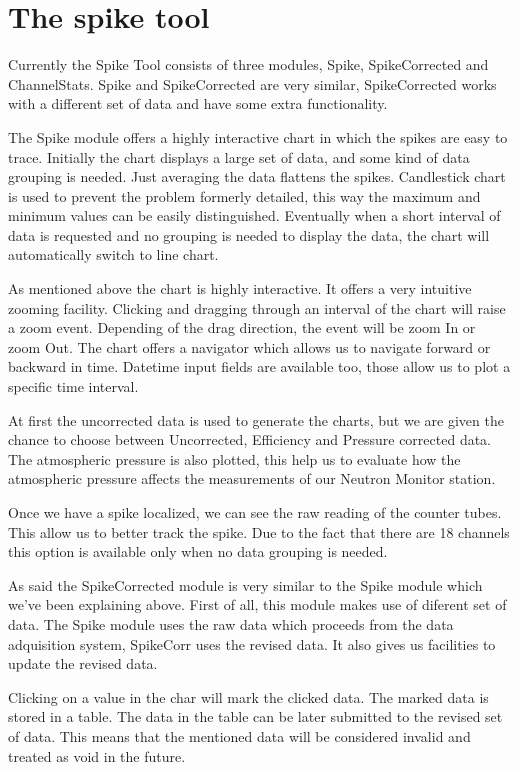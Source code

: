 \documentclass[a4paper]{jpconf}
\begin{document}
\section{The spike tool}

Currently the Spike Tool consists of three modules, Spike, SpikeCorrected and
ChannelStats. Spike and SpikeCorrected are very similar, SpikeCorrected works
with a different set of data and have some extra functionality.

The Spike module offers a highly interactive chart in which the spikes are easy
to trace. Initially the chart displays a large set of data, and some kind of
data grouping is needed. Just averaging the data flattens the spikes.
Candlestick chart is used to prevent the problem formerly detailed, this way the
maximum and minimum values can be easily distinguished. Eventually when a short interval
of data is requested and no grouping is needed to display the data, the chart
will automatically switch to line chart.

As mentioned above the chart is highly interactive. It offers a very intuitive
zooming facility. Clicking and dragging through an interval of the chart will
raise a zoom event. Depending of the drag direction, the event will be zoom In
or zoom Out. The chart offers a navigator which allows us to navigate forward or
backward in time. Datetime input fields are available too, those allow us to
plot a specific time interval.

At first the uncorrected data is used to generate the charts, but we are given
the chance to choose between Uncorrected, Efficiency and Pressure corrected
data. The atmospheric pressure is also plotted, this help us to evaluate how the
atmospheric pressure affects the measurements of our Neutron Monitor station.

Once we have a spike localized, we can see the raw reading of the counter tubes.
This allow us to better track the spike. Due to the fact that there are 18
channels this option is available only when no data grouping is needed.

As said the SpikeCorrected module is very similar to the Spike module which
we've been explaining above. First of all, this module makes use of diferent set
of data. The Spike module uses the raw data which proceeds from the data
adquisition system, SpikeCorr uses the revised data. It also gives us
facilities to update the revised data.

Clicking on a value in the char will mark the clicked data. The marked data is
stored in a table. The data in the table can be later submitted to the revised 
set of data. This means that the mentioned data will be considered invalid and
treated as void in the future.
\end{document}

